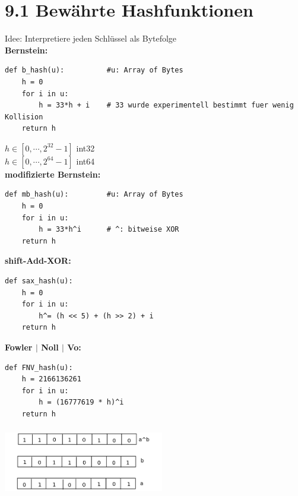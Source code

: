 \documentclass[11pt, fleqn]{scrreprt}
\begin{document}
\section*{9.1 Bewährte Hashfunktionen}
Idee: Interpretiere jeden Schlüssel als Bytefolge\\

\textbf{Bernstein:}
\begin{verbatim}
def b_hash(u):          #u: Array of Bytes
    h = 0
    for i in u:
        h = 33*h + i    # 33 wurde experimentell bestimmt fuer wenig Kollision
    return h
\end{verbatim}
$h \in [0, \cdots, 2^{32} -1]$ int32 \\
$h \in [0, \cdots, 2^{64} -1]$ int64 \\


\textbf{modifizierte Bernstein:}
\begin{verbatim}
def mb_hash(u):         #u: Array of Bytes
    h = 0
    for i in u:
        h = 33*h^i      # ^: bitweise XOR
    return h
\end{verbatim}

\textbf{shift-Add-XOR:}
\begin{verbatim}
def sax_hash(u):
    h = 0
    for i in u:
        h^= (h << 5) + (h >> 2) + i
    return h
\end{verbatim}

\textbf{Fowler $|$ Noll $|$ Vo:}
\begin{verbatim}
def FNV_hash(u):
    h = 2166136261
    for i in u:
        h = (16777619 * h)^i
    return h
\end{verbatim}
\includegraphics[width=7cm,height=3cm,keepaspectratio]{./Pictures/abArrays.png}
\end{document}
